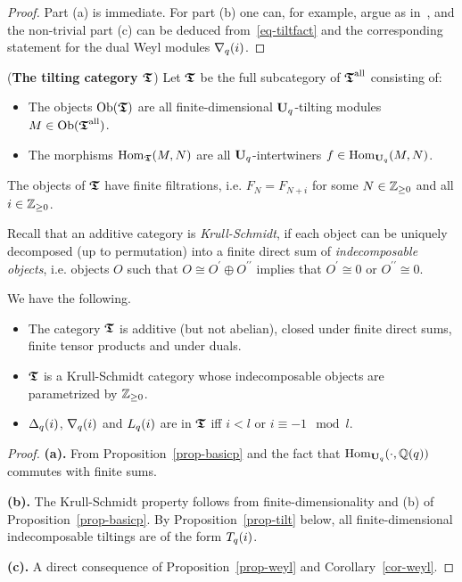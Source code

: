 \begin{proof}
Part (a) is immediate. For part (b) one can, for 
example, argue as in~\cite[Proposition~3.7]{hum}, and the non-trivial 
part (c) can be deduced from~\eqref{eq-tiltfact} 
and the corresponding statement for the dual Weyl modules $\nabla_q({i})$.
\end{proof}


\begin{defn}(\textbf{The tilting category $\boldsymbol{\mathfrak{T}}$})\label{defn-tiltcat}
Let $\boldsymbol{\mathfrak{T}}$ be the full subcategory of $\boldsymbol{\mathfrak{T}}^{\mathrm{all}}$ consisting of:
\begin{itemize}
\item The objects $\mathrm{Ob}(\boldsymbol{\mathfrak{T}})$ are all 
finite-dimensional $\boldsymbol{\mathrm{U}}_q$-tilting modules $M\in\mathrm{Ob}(\boldsymbol{\mathfrak{T}}^{\mathrm{all}})$.
\item The morphisms $\mathrm{Hom}_{\boldsymbol{\mathfrak{T}}}(M,N)$ are all $\boldsymbol{\mathrm{U}}_q$-intertwiners $f\in\mathrm{Hom}_{\boldsymbol{\mathrm{U}}_q}(M,N)$. 
\end{itemize}
The objects of $\boldsymbol{\mathfrak{T}}$ have finite filtrations, 
i.e. $F_N=F_{N+i}$ for some $N\in\mathbb{Z}_{\geq 0}$ and all $i\in\mathbb{Z}_{\geq 0}$.
\end{defn}

Recall that an additive category is \textit{Krull-Schmidt}, 
if each object can be uniquely decomposed (up to permutation) 
into a finite direct sum of \textit{indecomposable objects}, i.e. objects 
$O$ such that $O\cong O^{\prime}\oplus O^{\prime\prime}$ implies that 
$O^{\prime}\cong 0$ or $O^{\prime\prime}\cong 0$.

\begin{lem}\label{lem-tiltcat}
We have the following.
\begin{itemize}
\item[(a)] The category $\boldsymbol{\mathfrak{T}}$ is additive (but not abelian), closed under 
finite direct sums, finite tensor products and under duals.
\item[(b)] $\boldsymbol{\mathfrak{T}}$ is a Krull-Schmidt category whose 
indecomposable objects are parametrized by $\mathbb{Z}_{\geq 0}$.
\item[(c)] $\Delta_q({i})$, $\nabla_q({i})$ and $L_q({i})$ are in $\boldsymbol{\mathfrak{T}}$ 
iff $i<l$ or $i\equiv-1\mod l$.\makeqed
\end{itemize}
\end{lem}


\begin{proof}
%
\textbf{(a).} From Proposition~\ref{prop-basicp} and the fact that 
$\mathrm{Hom}_{\boldsymbol{\mathrm{U}}_q}(\cdot,\mathbb{Q}(q))$ commutes with finite sums.

\textbf{(b).} 
The Krull-Schmidt property follows from finite-dimensionality and 
(b) of Proposition~\ref{prop-basicp}.
By Proposition~\ref{prop-tilt} below, all finite-dimensional 
indecomposable tiltings are of the form $T_q({i})$.


\textbf{(c).} A direct consequence of Proposition~\ref{prop-weyl} and Corollary~\ref{cor-weyl}.
\end{proof}



